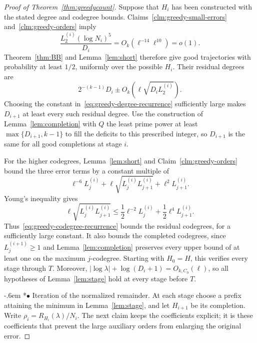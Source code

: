 \documentclass[11pt,reqno]{amsart}
\makeatletter
\numberwithin{equation}{section}
\renewcommand{\paragraph}{\@startsection{paragraph}{4}%
    \z@{.75\linespacing\@plus.2\linespacing\@minus.1\linespacing}%
    {-.6em}%
    {\normalfont\bfseries}}
\newcommand{\proofparagraph}[1]{%
    \paragraph*{$\bullet$ #1}\ignorespaces}
\theoremstyle{plain}
\theoremstyle{definition}
\makeatother
\begin{document}
\begin{proof}[Proof of Theorem~\ref{thm:greedycount}]
    Suppose that $H_i$ has been constructed with the stated degree and codegree bounds.
    Claims~\ref{clm:greedy-small-errors} and~\ref{clm:greedy-orders} imply
    \[
        \frac{L_2^{(i)}(\log N_i)^5}{D_i}
        =O_k(\ell^{-14}\ell^{10})=o(1).
    \]
    Theorem~\ref{thm:BB} and Lemma~\ref{lem:short} therefore give good trajectories with probability at least $1/2$, uniformly over the possible $H_i$.
    Their residual degrees are
    \[
        2^{-(k-1)}D_i\pm O_k(\ell\sqrt{D_iL_2^{(i)}}).
    \]
    Choosing the constant in~\eqref{eq:greedy-degree-recurrence} sufficiently large makes $D_{i+1}$ at least every such residual degree.
    Use the construction of Lemma~\ref{lem:completion} with $Q$ the least prime power at least $\max\{D_{i+1},k-1\}$ to fill the deficits to this prescribed integer, so $D_{i+1}$ is the same for all good completions at stage $i$.

    For the higher codegrees, Lemma~\ref{lem:short} and Claim~\ref{clm:greedy-orders} bound the three error terms by a constant multiple of
    \[
        \ell^{-6}L_j^{(i)}
        +\ell\sqrt{L_j^{(i)}L_{j+1}^{(i)}}
        +\ell^2L_{j+1}^{(i)}.
    \]
    Young's inequality gives
    \[
        \ell\sqrt{L_j^{(i)}L_{j+1}^{(i)}}
        \le\frac12\ell^{-2}L_j^{(i)}
        +\frac12\ell^4L_{j+1}^{(i)}.
    \]
    Thus~\eqref{eq:greedy-codegree-recurrence} bounds the residual codegrees, for a sufficiently large constant.
    It also bounds the completed codegrees, since $L_j^{(i+1)}\ge1$ and Lemma~\ref{lem:completion} preserves every upper bound of at least one on the maximum $j$-codegree.
    Starting with $H_0=H$, this verifies every stage through $T$.
    Moreover, $|\log\lambda|+\log(D_i+1)=O_{k,C_0}(\ell)$, so all hypotheses of Lemma~\ref{lem:stage} hold at every stage before $T$.

    \proofparagraph{Iteration of the normalized remainder.}
    At each stage choose a prefix attaining the minimum in Lemma~\ref{lem:stage}, and let $H_{i+1}$ be its completion.
    Write $\rho_i=R_{H_i}(\lambda)/N_i$.
    The next claim keeps the coefficients explicit; it is these coefficients that prevent the large auxiliary orders from enlarging the original error.


\end{proof}
\end{document}
